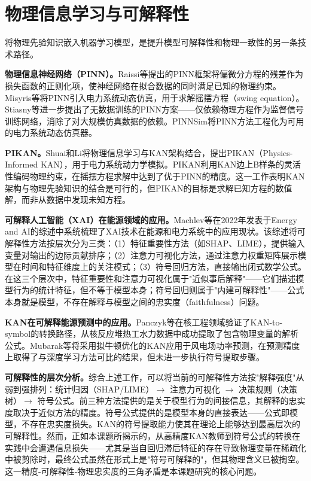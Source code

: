 \section{物理信息学习与可解释性}

将物理先验知识嵌入机器学习模型，是提升模型可解释性和物理一致性的另一条技术路径。

\textbf{物理信息神经网络（PINN）。}Raissi等提出的PINN框架将偏微分方程的残差作为损失函数的正则化项，使神经网络在拟合数据的同时满足已知的物理约束。Misyris等\cite{misyris2020physics}将PINN引入电力系统动态仿真，用于求解摇摆方程（swing equation）。Stiasny等\cite{stiasny2021learning}进一步提出了无数据训练的PINN方案——仅依赖物理方程作为监督信号训练网络，消除了对大规模仿真数据的依赖。PINNSim\cite{pinnsim2023}将PINN方法工程化为可用的电力系统动态仿真器。

\textbf{PIKAN。}Shuai和Li\cite{shuai2024pikan}将物理信息学习与KAN架构结合，提出PIKAN（Physics-Informed KAN），用于电力系统动力学模拟。PIKAN利用KAN边上B样条的灵活性编码物理约束，在摇摆方程求解中达到了优于PINN的精度。这一工作表明KAN架构与物理先验知识的结合是可行的，但PIKAN的目标是求解已知方程的数值解，而非从数据中发现未知方程。

\textbf{可解释人工智能（XAI）在能源领域的应用。}Machlev等\cite{machlev2022explainable}在2022年发表于Energy and AI的综述中系统梳理了XAI技术在能源和电力系统中的应用现状。该综述将可解释性方法按层次分为三类：（1）特征重要性方法（如SHAP、LIME），提供输入变量对输出的边际贡献排序；（2）注意力可视化方法，通过注意力权重矩阵展示模型在时间和特征维度上的关注模式；（3）符号回归方法，直接输出闭式数学公式。在这三个层次中，特征重要性和注意力可视化属于"近似事后解释"——它们描述模型行为的统计特征，但不等于模型本身；符号回归则属于"内建可解释性"——公式本身就是模型，不存在解释与模型之间的忠实度（faithfulness）问题。

\textbf{KAN在可解释能源预测中的应用。}Panczyk等\cite{panczyk2024kan}在核工程领域验证了KAN-to-symbol的转换路径，从核反应堆热工水力数据中成功提取了包含物理变量的解析公式。Mubarak等\cite{mubarak2024kan}将采用拟牛顿优化的KAN应用于风电场功率预测，在预测精度上取得了与深度学习方法可比的结果，但未进一步执行符号提取步骤。

\textbf{可解释性的层次分析。}综合上述工作，可以将当前的可解释性方法按"解释强度"从弱到强排列：统计归因（SHAP/LIME）$\to$ 注意力可视化 $\to$ 决策规则（决策树）$\to$ 符号公式。前三种方法提供的是关于模型行为的间接信息，其解释的忠实度取决于近似方法的精度。符号公式提供的是模型本身的直接表达——公式即模型，不存在忠实度损失。KAN的符号提取能力使其在理论上能够达到最高层次的可解释性。然而，正如本课题所揭示的，从高精度KAN教师到符号公式的转换在实践中会遭遇信息损失——尤其是当自回归滞后特征的存在导致物理变量在稀疏化中被剪除时，最终公式虽然在形式上是"符号可解释的"，但其物理含义已被掏空。这一精度-可解释性-物理忠实度的三角矛盾是本课题研究的核心问题。

